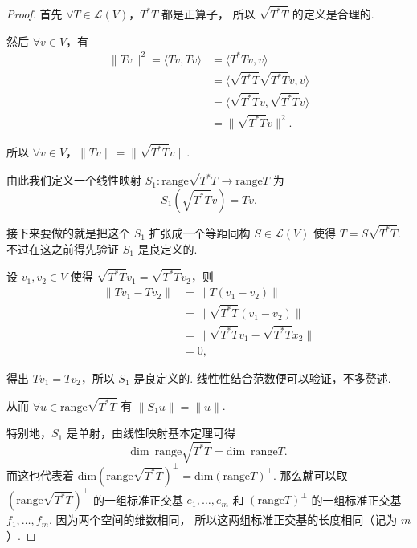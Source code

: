 \begin{proof}
    首先 $ \forall T \in \mathcal{L}(V) $，$ T^{*}T $ 都是正算子，
    所以 $ \sqrt{T^*T} $ 的定义是合理的. 

    然后 $ \forall v \in V $，有
    \begin{align*}
        \lVert Tv \rVert^2 = \langle Tv, Tv \rangle & = \langle T^*Tv, v \rangle \\
                                                    & = \langle \sqrt{T^*T}\sqrt{T^*T}v, v \rangle \\
                                                    & = \langle \sqrt{T^*T}v, \sqrt{T^*T}v \rangle \\
                                                    & = \lVert \sqrt{T^*T}v \rVert^2.
    \end{align*}

    所以 $ \forall v \in V $，$ \lVert Tv \rVert = \lVert \sqrt{T^*T}v \rVert $.

    由此我们定义一个线性映射 $ S_1: \mathrm{range}\sqrt{T^*T} \rightarrow \mathrm{range}T $ 为
    \[
        S_1(\sqrt{T^*T}v) = Tv.   
    \]

    接下来要做的就是把这个 $ S_1 $ 扩张成一个等距同构 $ S \in \mathcal{L}(V) $
    使得 $ T = S\sqrt{T^*T} $. 不过在这之前得先验证 $ S_1 $ 是良定义的. 
    
    设 $ v_1, v_2 \in V $ 使得 $ \sqrt{T^*T}v_1 = \sqrt{T^*T}v_2 $，则
    \begin{align*}
        \lVert Tv_1 - Tv_2 \rVert & = \lVert T(v_1 - v_2) \rVert \\
                                  & = \lVert \sqrt{T^*T}(v_1 - v_2)\rVert \\
                                  & = \lVert \sqrt{T^*T}v_1 - \sqrt{T^*T}x_2 \rVert \\
                                  & = 0,
    \end{align*}

    得出 $ Tv_1 = Tv_2 $，所以 $ S_1 $ 是良定义的. 线性性结合范数便可以验证，不多赘述. 

    从而 $ \forall u \in \mathrm{range}\sqrt{T^*T} $ 有 $ \lVert S_1u \rVert = \lVert u \rVert $.

    特别地，$ S_1 $ 是单射，由线性映射基本定理可得
    \[
        \mathrm{dim} \enspace \mathrm{range}\sqrt{T^*T} = \mathrm{dim} \enspace \mathrm{range}T.
    \]  
    而这也代表着 $ \mathrm{dim}(\mathrm{range}\sqrt{T^*T})^{\perp} = \mathrm{dim}(\mathrm{range}T)^{\perp} $.
    那么就可以取 $ (\mathrm{range}\sqrt{T^*T})^{\perp} $ 的一组标准正交基 $ e_1, \ldots , e_m $ 和 
    $ (\mathrm{range}T)^{\perp} $ 的一组标准正交基 $ f_1, \ldots, f_m $. 因为两个空间的维数相同，
    所以这两组标准正交基的长度相同（记为 $ m $）. 


\end{proof}
